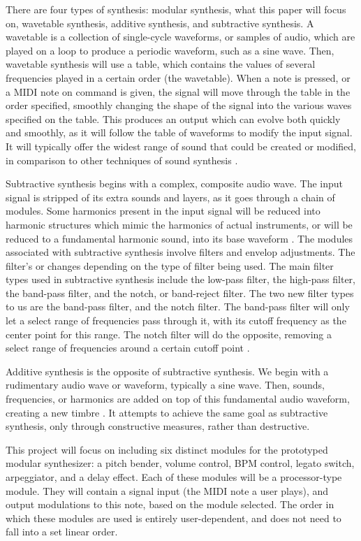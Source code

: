 There are four types of synthesis: modular synthesis, what this paper will focus on, wavetable synthesis, additive synthesis, and subtractive synthesis. A wavetable is a collection of single-cycle waveforms, or samples of audio, which are played on a loop to produce a periodic waveform, such as a sine wave. Then, wavetable synthesis will use a table, which contains the values of several frequencies played in a certain order (the wavetable). When a note is pressed, or a MIDI note on command is given, the signal will move through the table in the order specified, smoothly changing the shape of the signal into the various waves specified on the table. This produces an output which can evolve both quickly and smoothly, as it will follow the table of waveforms to modify the input signal. It will typically offer the widest range of sound that could be created or modified, in comparison to other techniques of sound synthesis \cite{Gabrielli_2020}.

Subtractive synthesis begins with a complex, composite audio wave. The input signal is stripped of its extra sounds and layers, as it goes through a chain of modules. Some harmonics present in the input signal will be reduced into harmonic structures which mimic the harmonics of actual instruments, or will be reduced to a fundamental harmonic sound, into its base waveform \cite{Gabrielli_2020}. The modules associated with subtractive synthesis involve filters and envelop adjustments. The filter's  or  changes depending on the type of filter being used. The main filter types used in subtractive synthesis include the low-pass filter, the high-pass filter, the band-pass filter, and the notch, or band-reject filter. The two new filter types to us are the band-pass filter, and the notch filter. The band-pass filter will only let a select range of frequencies pass through it, with its cutoff frequency as the center point for this range. The notch filter will do the opposite, removing a select range of frequencies around a certain cutoff point \cite{Gabrielli_2020}.

Additive synthesis is the opposite of subtractive synthesis. We begin with a rudimentary audio wave or waveform, typically a sine wave. Then, sounds, frequencies, or harmonics are added on top of this fundamental audio waveform, creating a new timbre \cite{Winer_2018}. It attempts to achieve the same goal as subtractive synthesis, only through constructive measures, rather than destructive. 

This project will focus on including six distinct modules for the prototyped modular synthesizer: a pitch bender, volume control, BPM control, legato switch, arpeggiator, and a delay effect. Each of these modules will be a processor-type module. They will contain a signal input (the MIDI note a user plays), and output modulations to this note, based on the module selected. The order in which these modules are used is entirely user-dependent, and does not need to fall into a set linear order. 